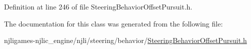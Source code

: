 Definition at line 246 of file Steering\+Behavior\+Offset\+Pursuit.\+h.



The documentation for this class was generated from the following file\+:\begin{DoxyCompactItemize}
\item 
njligames-\/njlic\+\_\+engine/njli/steering/behavior/\mbox{\hyperlink{_steering_behavior_offset_pursuit_8h}{Steering\+Behavior\+Offset\+Pursuit.\+h}}\end{DoxyCompactItemize}
